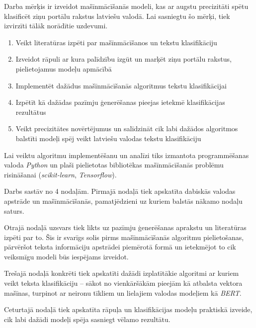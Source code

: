 Darba mērķis ir izveidot mašīnmācīšanās modeli, kas ar augstu precizitāti spētu klasificēt ziņu portālu rakstus latviešu valodā. Lai sasniegtu šo mērķi, tiek izvirzīti tālāk norādītie uzdevumi.
\begin{enumerate}
\item Veikt literatūras izpēti par mašīnmācīšanos un tekstu klasifikāciju
\item Izveidot rāpuli ar kura palīdzību izgūt un marķēt ziņu portālu rakstus, pielietojamus modeļu apmācībā
\item Implementēt dažādus mašīnmācīšanās algoritmus tekstu klasifikācijai
\item Izpētīt kā dažādas pazīmju ģenerēšanas pieejas ietekmē klasifikācijas rezultātus
\item Veikt precizitātes novērtējumus un salīdzināt cik labi dažādos algoritmos balstīti modeļi spēj veikt latviešu valodas tekstu klasifikāciju
\end{enumerate}

Lai veiktu algoritmu implementēšanu un analīzi tiks izmantota programmēšanas valoda \textit{Python} un plaši pielietotas bibliotēkas mašīnmācīšanās problēmu risināšanai (\textit{scikit-learn}, \textit{Tensorflow}).

Darbs sastāv no 4 nodaļām. Pirmajā nodaļā tiek apskatīta dabiskās valodas apstrāde un mašīnmācīšanās, pamatjēdzieni uz kuriem balstās nākamo nodaļu saturs.

Otrajā nodaļā uzsvars tiek likts uz pazīmju ģenerēšanas aprakstu un literatūras izpēti par to. Šis ir svarīgs solis pirms mašīnmācīšanās algoritmu pielietošanas, pārvēršot teksta informāciju apstrādei piemērotā formā un ietekmējot to cik veiksmīgu modeli būs iespējams izveidot.

Trešajā nodaļā konkrēti tiek apskatīti dažādi izplatītākie algoritmi ar kuriem veikt teksta klasifikāciju – sākot no vienkāršākām pieejām kā atbalsta vektora mašīnas, turpinot ar neironu tīkliem un lielajiem valodas modeļiem kā \textit{BERT}.

Ceturtajā nodaļā tiek apskatīta rāpuļa un klasifikācijas modeļu praktiskā izveide, cik labi dažādi modeļi spēja sasniegt vēlamo rezultātu.
